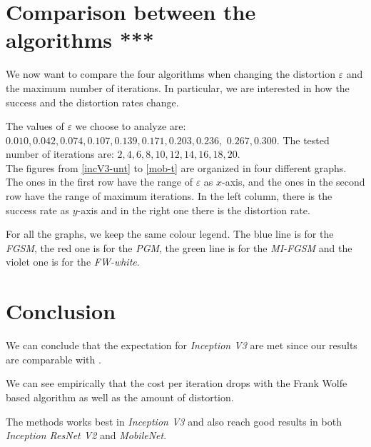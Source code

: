 \documentclass[10pt,twocolumn,letterpaper, english]{article}
\theoremstyle{definition}
\theoremstyle{plain}
\theoremstyle{plain}
\theoremstyle{plain}
\theoremstyle{plain}
\theoremstyle{remark}
\theoremstyle{remark}
\theoremstyle{definition}
\theoremstyle{definition}
\theoremstyle{definition}
\theoremstyle{definition}
\renewcommand{\epsilon}{\varepsilon}
\begin{document}
\section{Comparison between the algorithms ***}
\label{section:graphs}

We now want to compare the four algorithms when changing the distortion $\epsilon$ and the maximum number of iterations. 
In particular, we are interested in how the success and the distortion rates change. 

The values of $\epsilon$ we choose to analyze are: $0.010, 0.042, 0.074, 0.107, 0.139, 0.171, 0.203, 0.236,$  $0.267, 0.300$. The tested number of iterations are: $2,4,6,8,10,12,14,16,18,20$. \\

The figures from \ref{incV3-unt} to \ref{mob-t} are organized in four different graphs. 
The ones in the first row have the range of $\epsilon$ as $x$-axis, and the ones in the second row have the range of maximum iterations. 
In the left column, there is the success rate as $y$-axis and in the right one there is the distortion rate. 

For all the graphs, we keep the same colour legend. 
The blue line is for the \textit{FGSM}, the red one is for the \textit{PGM}, the green line is for the \textit{MI-FGSM} and the violet one is for the \textit{FW-white}. 


\section{Conclusion}

We can conclude that the expectation for \textit{Inception V3} are met since our results are comparable with \cite{frank}.

We can see empirically that the cost per iteration drops with the Frank Wolfe based algorithm as well as the amount of distortion.

The methods works best in \textit{Inception V3} and also reach good results in both \textit{Inception ResNet V2} and \textit{MobileNet}.



{\small


}


\newpage 
\onecolumn 
\end{document}
